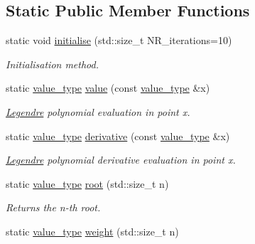\subsection*{Static Public Member Functions}
\begin{DoxyCompactItemize}
\item 
static void \hyperlink{a00323_a6e64948b240f9bf2a13a815e5e813d91}{initialise} (std\+::size\+\_\+t N\+R\+\_\+iterations=10)
\begin{DoxyCompactList}\small\item\em Initialisation method. \end{DoxyCompactList}\item 
\hypertarget{a00323_aa6108158ad3067ce30d29013f1a69d63}{}static \hyperlink{a00323_a6eb9a63823f5074b09c8c916818d94e7}{value\+\_\+type} \hyperlink{a00323_aa6108158ad3067ce30d29013f1a69d63}{value} (const \hyperlink{a00323_a6eb9a63823f5074b09c8c916818d94e7}{value\+\_\+type} \&x)\label{a00323_aa6108158ad3067ce30d29013f1a69d63}

\begin{DoxyCompactList}\small\item\em \hyperlink{a00323}{Legendre} polynomial evaluation in point x. \end{DoxyCompactList}\item 
\hypertarget{a00323_af34d5658c1c955157d2a82f2ff3a9d00}{}static \hyperlink{a00323_a6eb9a63823f5074b09c8c916818d94e7}{value\+\_\+type} \hyperlink{a00323_af34d5658c1c955157d2a82f2ff3a9d00}{derivative} (const \hyperlink{a00323_a6eb9a63823f5074b09c8c916818d94e7}{value\+\_\+type} \&x)\label{a00323_af34d5658c1c955157d2a82f2ff3a9d00}

\begin{DoxyCompactList}\small\item\em \hyperlink{a00323}{Legendre} polynomial derivative evaluation in point x. \end{DoxyCompactList}\item 
\hypertarget{a00323_a15d6ba871e96f4b44f9063d5240b8e7c}{}static \hyperlink{a00323_a6eb9a63823f5074b09c8c916818d94e7}{value\+\_\+type} \hyperlink{a00323_a15d6ba871e96f4b44f9063d5240b8e7c}{root} (std\+::size\+\_\+t n)\label{a00323_a15d6ba871e96f4b44f9063d5240b8e7c}

\begin{DoxyCompactList}\small\item\em Returns the n-\/th root. \end{DoxyCompactList}\item 
\hypertarget{a00323_ae15e195f92889818dcd965c0b98648d7}{}static \hyperlink{a00323_a6eb9a63823f5074b09c8c916818d94e7}{value\+\_\+type} \hyperlink{a00323_ae15e195f92889818dcd965c0b98648d7}{weight} (std\+::size\+\_\+t n)\label{a00323_ae15e195f92889818dcd965c0b98648d7}


\end{DoxyCompactItemize}
